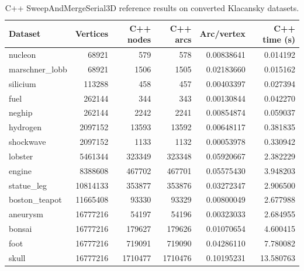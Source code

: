 \begin{table}[htbp]
\centering
\small
\caption{C++ SweepAndMergeSerial3D reference results on converted Klacansky datasets.}
\label{tab:cpp-reference-results}
\begin{tabular}{lrrrrr}
\hline
Dataset & Vertices & C++ nodes & C++ arcs & Arc/vertex & C++ time (s) \\
\hline
nucleon & 68921 & 579 & 578 & 0.00838641 & 0.014192 \\
marschner\_lobb & 68921 & 1506 & 1505 & 0.02183660 & 0.015162 \\
silicium & 113288 & 458 & 457 & 0.00403397 & 0.027394 \\
fuel & 262144 & 344 & 343 & 0.00130844 & 0.042270 \\
neghip & 262144 & 2242 & 2241 & 0.00854874 & 0.059037 \\
hydrogen & 2097152 & 13593 & 13592 & 0.00648117 & 0.381835 \\
shockwave & 2097152 & 1133 & 1132 & 0.00053978 & 0.330942 \\
lobster & 5461344 & 323349 & 323348 & 0.05920667 & 2.382229 \\
engine & 8388608 & 467702 & 467701 & 0.05575430 & 3.948203 \\
statue\_leg & 10814133 & 353877 & 353876 & 0.03272347 & 2.906500 \\
boston\_teapot & 11665408 & 93330 & 93329 & 0.00800049 & 2.677988 \\
aneurysm & 16777216 & 54197 & 54196 & 0.00323033 & 2.684955 \\
bonsai & 16777216 & 179627 & 179626 & 0.01070654 & 4.600415 \\
foot & 16777216 & 719091 & 719090 & 0.04286110 & 7.780082 \\
skull & 16777216 & 1710477 & 1710476 & 0.10195231 & 13.580763 \\
\hline
\end{tabular}
\end{table}
